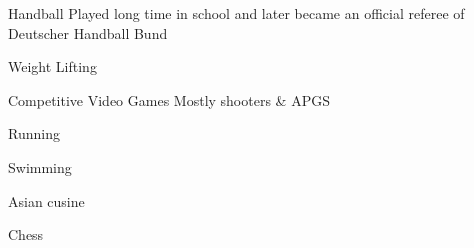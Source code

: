 



\begin{cvhonors}

  \cvhonor
    {Handball} %
    {Played long time in school and later became an official referee of Deutscher Handball Bund} %
    {} %
    {} %

  \cvhonor
    {Weight Lifting} %
    {} %
    {} %
    {} %

  \cvhonor
    {Competitive Video Games} %
    {Mostly shooters \& APGS} %
    {} %
    {} %

  \cvhonor
    {Running} %
    {} %
    {} %
    {} %

\end{cvhonors}




\begin{cvhonors}

  \cvhonor
    {Swimming} %
    {} %
    {} %
    {} %

  \cvhonor
  {Asian cusine} %
  {} %
  {} %
  {} %

  \cvhonor
  {Chess} %
  {} %
  {} %
  {} %

\end{cvhonors}
